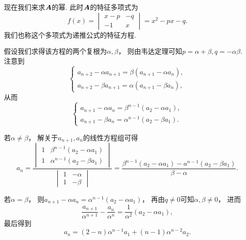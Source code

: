 现在我们来求\(\boldsymbol{A}\)的幂.
此时\(\boldsymbol{A}\)的特征多项式为\begin{equation*}
	f(x)
	= \begin{vmatrix}
		x-p & -q \\
		-1 & x
	\end{vmatrix}
	= x^2 - px - q.
\end{equation*}
我们也称这个多项式为递推公式的特征方程.

假设我们求得该方程的两个复根为\(\alpha,\beta\)，
则由韦达定理可知\(p=\alpha+\beta, q=-\alpha\beta\).
注意到\begin{equation*}
	\left\{ \begin{array}{l}
		a_{n+2} - \alpha a_{n+1} = \beta(a_{n+1}-\alpha a_n), \\
		a_{n+2} - \beta a_{n+1} = \alpha(a_{n+1}-\beta a_n),
	\end{array} \right.
\end{equation*}
从而\begin{equation*}
	\left\{ \begin{array}{l}
		a_{n+1} - \alpha a_n = \beta^{n-1} (a_2 - \alpha a_1), \\
		a_{n+1} - \beta a_n = \alpha^{n-1} (a_2 - \beta a_1).
	\end{array} \right.
\end{equation*}

若\(\alpha\neq\beta\)，
解关于\(a_{n+1},a_n\)的线性方程组可得\begin{equation*}
	a_n
	= \frac
		{
			\begin{vmatrix}
				1 & \beta^{n-1}(a_2 - \alpha a_1) \\
				1 & \alpha^{n-1}(a_2 - \beta a_1)
			\end{vmatrix}
		}
		{
			\begin{vmatrix}
				1 & -\alpha \\
				1 & -\beta
			\end{vmatrix}
		}
	= \frac{\beta^{n-1} (a_2 - \alpha a_1) - a^{n-1} (a_2 - \beta a_1)}{\beta-\alpha}.
\end{equation*}

若\(\alpha=\beta\)，
则\(a_{n+1} - \alpha a_n = \alpha^{n-1} (a_2 - \alpha a_1)\)，
再由\(q\neq0\)可知\(\alpha,\beta\neq0\)，
进而\begin{equation*}
	\frac{a_{n+1}}{\alpha^{n+1}} - \frac{a_n}{\alpha^n}
	= \frac{1}{\alpha^2}(a_2-\alpha a_1),
\end{equation*}
最后得到\begin{equation*}
	a_n = (2-n)\alpha^{n-1} a_1 + (n-1) \alpha^{n-2} a_2.
\end{equation*}


